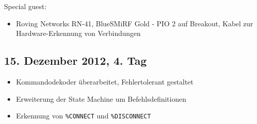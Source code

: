 Special guest:

\begin{itemize}
	\item Roving Networks RN-41, BlueSMiRF Gold - PIO 2 auf Breakout, Kabel zur Hardware-Erkennung von Verbindungen
\end{itemize}

\subsection{15. Dezember 2012, 4. Tag}

\begin{itemize}
	\item Kommandodekoder überarbeitet, Fehlertolerant gestaltet
	\item Erweiterung der State Machine um Befehlsdefinitionen
	\item Erkennung von \texttt{\%CONNECT} und \texttt{\%DISCONNECT}
\end{itemize}